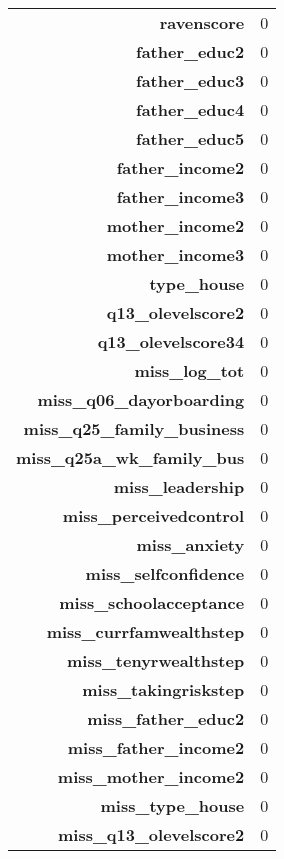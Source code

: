 \begin{longtable}{rl}
\textbf{ravenscore} & 0 \\
\textbf{father\_educ2} & 0 \\
\textbf{father\_educ3} & 0 \\
\textbf{father\_educ4} & 0 \\
\textbf{father\_educ5} & 0 \\
\textbf{father\_income2} & 0 \\
\textbf{father\_income3} & 0 \\
\textbf{mother\_income2} & 0 \\
\textbf{mother\_income3} & 0 \\
\textbf{type\_house} & 0 \\
\textbf{q13\_olevelscore2} & 0 \\
\textbf{q13\_olevelscore34} & 0 \\
\textbf{miss\_log\_tot} & 0 \\
\textbf{miss\_q06\_dayorboarding} & 0 \\
\textbf{miss\_q25\_family\_business} & 0 \\
\textbf{miss\_q25a\_wk\_family\_bus} & 0 \\
\textbf{miss\_leadership} & 0 \\
\textbf{miss\_perceivedcontrol} & 0 \\
\textbf{miss\_anxiety} & 0 \\
\textbf{miss\_selfconfidence} & 0 \\
\textbf{miss\_schoolacceptance} & 0 \\
\textbf{miss\_currfamwealthstep} & 0 \\
\textbf{miss\_tenyrwealthstep} & 0 \\
\textbf{miss\_takingriskstep} & 0 \\
\textbf{miss\_father\_educ2} & 0 \\
\textbf{miss\_father\_income2} & 0 \\
\textbf{miss\_mother\_income2} & 0 \\
\textbf{miss\_type\_house} & 0 \\
\textbf{miss\_q13\_olevelscore2} & 0 \\
\end{longtable}


  
